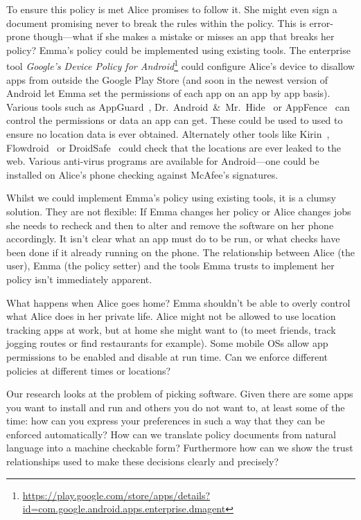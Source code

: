 \documentclass[]{llncs}
\begin{document}
To ensure this policy is met Alice promises to follow it.
She might even sign a document promising never to break the rules within the policy.
This is error-prone though---what if she makes a mistake or misses an app that breaks her policy?
Emma's policy could be implemented using existing tools.
The enterprise tool \emph{Google's Device Policy for Android}\footnote{\url{https://play.google.com/store/apps/details?id=com.google.android.apps.enterprise.dmagent}}
could configure Alice's device to disallow apps from outside the Google Play Store (and soon in the newest version of Android let Emma set the permissions of each app on an app by app basis).
Various tools such as AppGuard~\cite{Backes:2012vm}, Dr.~Android~\&~Mr.~Hide~\cite{Jeon:2012ki} or AppFence~\cite{Hornyack:2011wq} can control the permissions or data an app can get.
These could be used to used to ensure no location data is ever obtained.
Alternately other tools like Kirin~\cite{Enck:2009ko}, Flowdroid~\cite{Fritz:2013vi} or DroidSafe~\cite{Gordon:2015et} could check that the locations are ever leaked to the web.
Various anti-virus programs are available for Android---one could be installed on Alice's phone checking against McAfee's signatures.

Whilst we could implement Emma's policy using existing tools, it is a clumsy solution.
They are not flexible: If Emma changes her policy or Alice changes jobs she needs to recheck and then to alter and remove the software on her phone accordingly.
It isn't clear what an app must do to be run, or what checks have been done if it already running on the phone.
The relationship between Alice (the user), Emma (the policy setter) and the tools Emma trusts to implement her policy isn't immediately apparent.

What happens when Alice goes home?
Emma shouldn't be able to overly control what Alice does in her private life.
Alice might not be allowed to use location tracking apps at work, but at home she might want to (to meet friends, track jogging routes or find restaurants for example).
Some mobile OSs allow app permissions to be enabled and disable at run time.
Can we enforce different policies at different times or locations?

Our research looks at the problem of picking software.
Given there are some apps you want to install and run and others you do not want to, at least some of the time:
  how can you express your preferences in such a way that they can be enforced automatically?
How can we translate policy documents from natural language into a machine checkable form?
Furthermore how can we show the trust relationships used to make these decisions clearly and precisely?
\end{document}
